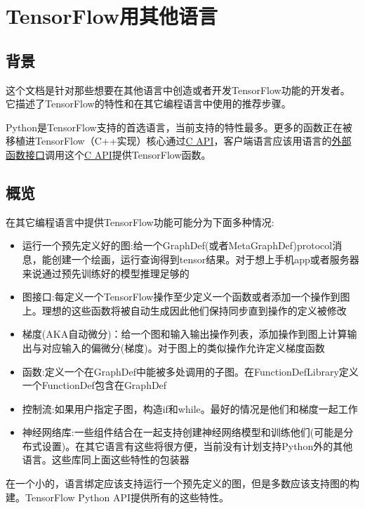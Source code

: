 \section{TensorFlow用其他语言}
\subsection{背景}
这个文档是针对那些想要在其他语言中创造或者开发TensorFlow功能的开发者。它描述了TensorFlow的特性和在其它编程语言中使用的推荐步骤。

Python是TensorFlow支持的首选语言，当前支持的特性最多。更多的函数正在被移植进TensorFlow（C++实现）核心通过\href{https://www.github.com/tensorflow/tensorflow/blob/r1.4/tensorflow/c/c_api.h}{C API}，客户端语言应该用语言的\href{https://en.wikipedia.org/wiki/Foreign_function_interface}{外部函数接口}调用这个\href{https://www.github.com/tensorflow/tensorflow/blob/r1.4/tensorflow/c/c_api.h}{C API}提供TensorFlow函数。
\subsection{概览}
在其它编程语言中提供TensorFlow功能可能分为下面多种情况:
\begin{itemize}
\item 运行一个预先定义好的图:给一个GraphDef(或者MetaGraphDef)protocol消息，能创建一个绘画，运行查询得到tensor结果。对于想上手机app或者服务器来说通过预先训练好的模型推理足够的
\item 图接口:每定义一个TensorFlow操作至少定义一个函数或者添加一个操作到图上。理想的这些函数将被自动生成因此他们保持同步直到操作的定义被修改
\item 梯度(AKA自动微分)：给一个图和输入输出操作列表，添加操作到图上计算输出与对应输入的偏微分(梯度)。对于图上的类似操作允许定义梯度函数
\item 函数:定义一个在GraphDef中能被多处调用的子图。在FunctionDefLibrary定义一个FunctionDef包含在GraphDef
\item 控制流:如果用户指定子图，构造if和while。最好的情况是他们和梯度一起工作
\item 神经网络库:一些组件结合在一起支持创建神经网络模型和训练他们(可能是分布式设置)。在其它语言有这些将很方便，当前没有计划支持Python外的其他语言。这些库同上面这些特性的包装器
\end{itemize}
在一个小的，语言绑定应该支持运行一个预先定义的图，但是多数应该支持图的构建。TensorFlow Python API提供所有的这些特性。

